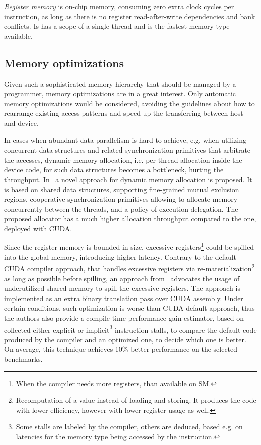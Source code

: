 \emph{Register memory} is on-chip memory, consuming zero extra clock cycles per instruction, as long as 
there is no register read-after-write dependencies and bank conflicts. Is has a scope of a single thread 
and is the fastest memory type available.


\subsection{Memory optimizations}
Given such a sophisticated memory hierarchy that should be managed by a programmer, memory optimizations 
are in a great interest. Only automatic memory optimizations would be considered, avoiding the guidelines 
about how to rearrange existing access patterns and speed-up the transferring between host and device.

In cases when abundant data parallelism is hard to achieve, e.g. when utilizing concurrent data structures 
and related synchronization primitives that arbitrate the accesses, dynamic memory allocation, i.e. per-thread allocation
 inside the device code, for such data structures becomes a bottleneck, hurting the throughput. In~\cite{NvidiaAllocator}
  a novel approach for dynamic memory allocation is proposed. It is based on shared data structures, supporting fine-grained
   mutual exclusion regions, cooperative synchronization primitives allowing to allocate memory concurrently between the threads,
    and a policy of execution delegation. The proposed allocator has a much higher allocation throughput compared to the one, deployed with CUDA.

Since the register memory is bounded in size, excessive registers\footnote{When the compiler needs more registers, than available on SM.} 
could be spilled into the global memory, introducing higher latency. 
Contrary to the default CUDA compiler approach, that handles excessive
 registers via re-materialization\footnote{Recomputation of a value instead 
 of loading and storing.
It produces the code with lower efficiency, however with lower register usage as well.} 
as long as possible before spilling, an approach from~\cite{RegisterSpilling} advocates 
the usage of underutilized shared memory to spill the excessive registers.
The approach is implemented as an extra binary translation pass over CUDA assembly.
Under certain conditions, such optimization is worse than CUDA default approach, thus 
the authors also provide a compile-time performance gain estimator, based on collected either explicit or implicit\footnote{Some stalls are labeled by the compiler, others are deduced, based e.g. on latencies for the memory type being accessed by the instruction.} instruction stalls, to compare the default code produced by the compiler and an optimized one, to decide which one is better.
On average, this technique achieves 10\% better performance on the selected benchmarks.


